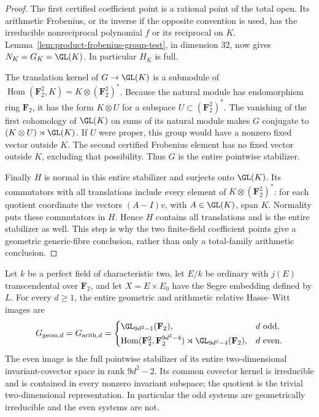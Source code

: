 \begin{proof}
The first certified coefficient point is a rational point of
the total open. Its arithmetic Frobenius, or its inverse if
the opposite convention is used, has the irreducible
nonreciprocal polynomial $f$ or its reciprocal on $K$.
Lemma~\ref{lem:product-frobenius-group-test}, in dimension
$32$, now gives $N_K=G_K=\GL(K)$. In particular $H_K$ is full.

The translation kernel of $G\to\GL(K)$ is a submodule of
$\operatorname{Hom}(\mathbf F_2^2,K)=K\otimes(\mathbf F_2^2)^*$.
Because the natural module has endomorphism ring $\mathbf F_2$,
it has the form $K\otimes U$ for a subspace
$U\subset(\mathbf F_2^2)^*$. The vanishing of the first
cohomology of $\GL(K)$ on sums of its natural module makes
$G$ conjugate to $(K\otimes U)\rtimes\GL(K)$.
If $U$ were proper, this group would have a nonzero fixed
vector outside $K$. The second certified Frobenius element
has no fixed vector outside $K$, excluding that possibility.
Thus $G$ is the entire pointwise stabilizer.

Finally $H$ is normal in this entire stabilizer and surjects
onto $\GL(K)$. Its commutators with all translations include
every element of $K\otimes(\mathbf F_2^2)^*$: for each quotient
coordinate the vectors $(A-I)v$, with $A\in\GL(K)$, span $K$.
Normality puts these commutators in $H$. Hence $H$ contains
all translations and is the entire stabilizer as well.
This step is why the two finite-field coefficient points
give a geometric generic-fibre conclusion, rather than only
a total-family arithmetic conclusion.
\end{proof}

\begin{theorem}
\label{thm:generic-mixed-product-all-groups-candidate}
Let $k$ be a perfect field of characteristic two, let $E/k$
be ordinary with $j(E)$ transcendental over $\mathbf F_2$,
and let $X=E\times E_0$ have the Segre embedding defined
by $L$. For every $d\ge1$, the entire geometric and arithmetic
relative Hasse--Witt images are
\[
 G_{\mathrm{geom},d}=G_{\mathrm{arith},d}=
 \begin{cases}
 \GL_{9d^2-1}(\mathbf F_2),&d\text{ odd},\\[2pt]
 \operatorname{Hom}(\mathbf F_2^2,\mathbf F_2^{9d^2-4})
       \rtimes\GL_{9d^2-4}(\mathbf F_2),&d\text{ even}.
 \end{cases}
\]
The even image is the full pointwise stabilizer of its entire
two-dimensional invariant-covector space in rank $9d^2-2$.
Its common covector kernel is irreducible and is contained in
every nonzero invariant subspace; the quotient is the trivial
two-dimensional representation. In particular the odd systems
are geometrically irreducible and the even systems are not.
\end{theorem}

